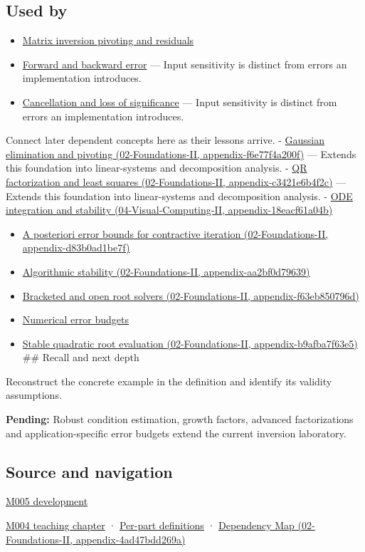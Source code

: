 \subsection{Used by}\label{used-by}

\begin{itemize}
\item
  \hyperref[appendix-48d2e66378ab]{Matrix inversion pivoting and residuals}
\item
  \hyperref[appendix-a7fbaf6d1b1c]{Forward and backward error} --- Input sensitivity is distinct from errors an implementation introduces.
\item
  \hyperref[appendix-a2773a6a2f9d]{Cancellation and loss of significance} --- Input sensitivity is distinct from errors an implementation introduces.
\end{itemize}

Connect later dependent concepts here as their lessons arrive. - \href{}{Gaussian elimination and pivoting (02-Foundations-II, appendix-f6e77f4a200f)} --- Extends this foundation into linear-systems and decomposition analysis. - \href{}{QR factorization and least squares (02-Foundations-II, appendix-c3421e6b4f2c)} --- Extends this foundation into linear-systems and decomposition analysis. - \href{}{ODE integration and stability (04-Visual-Computing-II, appendix-18eacf61a04b)}

\begin{itemize}
\tightlist
\item
  \href{}{A posteriori error bounds for contractive iteration (02-Foundations-II, appendix-d83b0ad1be7f)}
\item
  \href{}{Algorithmic stability (02-Foundations-II, appendix-aa2bf0d79639)}
\item
  \href{}{Bracketed and open root solvers (02-Foundations-II, appendix-f63eb850796d)}
\item
  \hyperref[appendix-31b8c295e05f]{Numerical error budgets}
\item
  \href{}{Stable quadratic root evaluation (02-Foundations-II, appendix-b9afba7f63e5)} \#\# Recall and next depth
\end{itemize}

Reconstruct the concrete example in the definition and identify its validity assumptions.

\textbf{Pending:} Robust condition estimation, growth factors, advanced factorizations and application-specific error budgets extend the current inversion laboratory.

\subsection{Source and navigation}\label{source-and-navigation}

\href{Continuous\%20Notes/Computing\%20Foundations\%20-\%20From\%20Bits\%20to\%20C++\%20and\%20Systems\%20APIs\#When\%20arithmetic\%20meets\%20uncertainty}{M005 development}

\href{Continuous\%20Notes/Computing\%20Foundations\%20-\%20From\%20Bits\%20to\%20C++\%20and\%20Systems\%20APIs\#A\%20stretching\%20ruler\%20for\%20real-valued\%20quantities}{M004 teaching chapter} · \hyperref[appendix-fd090d982a15]{Per-part definitions} · \href{}{Dependency Map (02-Foundations-II, appendix-4ad47bdd269a)}
